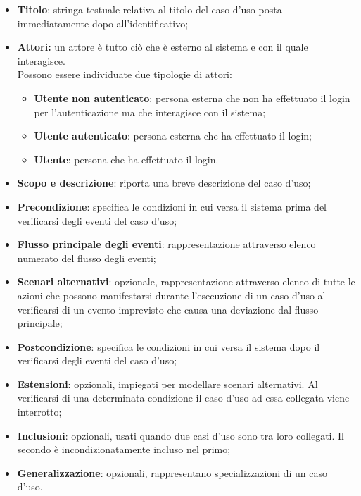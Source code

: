 				\begin{itemize}
					\item\textbf{Titolo}: stringa testuale relativa al titolo del caso d’uso posta immediatamente dopo all’identificativo;
					\item\textbf{Attori:} un attore è tutto ciò che è esterno al sistema e con il quale interagisce. \\
						Possono essere individuate due tipologie di attori:
						\begin{itemize}
							\item\textbf{Utente non autenticato}: persona esterna che non ha effettuato il login per l’autenticazione ma che interagisce con il sistema;
							\item\textbf{Utente autenticato}: persona esterna che ha effettuato il login;
							\item\textbf{Utente}: persona che ha effettuato il login.
						\end{itemize}
					\item\textbf{Scopo e descrizione}: riporta una breve descrizione del caso d’uso;
					\item\textbf{Precondizione}: specifica le condizioni in cui versa il sistema prima del verificarsi degli eventi del caso d’uso;
					\item\textbf{Flusso principale degli eventi}: rappresentazione attraverso elenco numerato del flusso degli eventi;
					\item\textbf{Scenari alternativi}: opzionale, rappresentazione attraverso elenco di tutte le azioni che possono manifestarsi durante l’esecuzione di un caso d’uso al verificarsi di un evento imprevisto che causa una deviazione dal flusso principale;
					\item\textbf{Postcondizione}: specifica le condizioni in cui versa il sistema dopo il verificarsi degli eventi del caso d’uso;
					\item\textbf{Estensioni}: opzionali, impiegati per modellare scenari alternativi. Al verificarsi di una determinata condizione il caso d’uso ad essa collegata viene interrotto;
					\item\textbf{Inclusioni}: opzionali, usati quando due casi d’uso sono tra loro collegati. Il secondo è incondizionatamente incluso nel primo;
					\item\textbf{Generalizzazione}: opzionali, rappresentano specializzazioni di un caso d’uso.
				\end{itemize}
